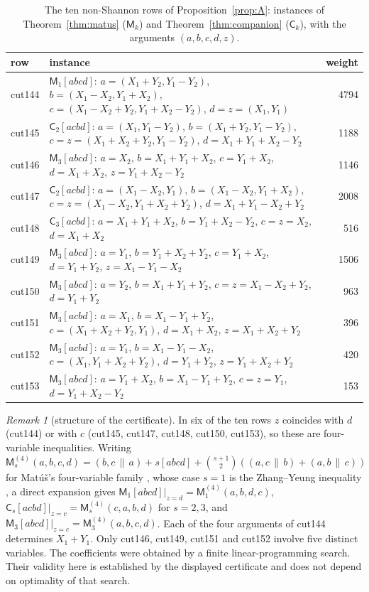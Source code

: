 \documentclass[11pt]{amsart}
\theoremstyle{definition}
\theoremstyle{remark}
\newtheorem{remark}[theorem]{Remark}
\numberwithin{equation}{section}
\newcommand{\cmi}[3]{(#1,#2\,\|\,#3)}
\begin{document}
\begin{table}[ht]
\small
\caption{The ten non-Shannon rows of Proposition~\ref{prop:A}: instances of
Theorem~\ref{thm:matus} ($\mathsf M_k$) and Theorem~\ref{thm:companion} ($\mathsf C_k$), with the
arguments $(a,b,c,d,z)$.}\label{tab:cuts}
\begin{tabular}{@{}l>{\raggedright\arraybackslash}p{11.2cm}r@{}}
\toprule
row & instance & weight\\
\midrule
cut144 & $\mathsf M_1[abcd]$: $a=(X_1+Y_2,Y_1-Y_2)$, $b=(X_1-X_2,Y_1+X_2)$, $c=(X_1-X_2+Y_2,Y_1+X_2-Y_2)$, $d=z=(X_1,Y_1)$ & 4794 \\
cut145 & $\mathsf C_2[acbd]$: $a=(X_1,Y_1-Y_2)$, $b=(X_1+Y_2,Y_1-Y_2)$, $c=z=(X_1+X_2+Y_2,Y_1-Y_2)$, $d=X_1+Y_1+X_2-Y_2$ & 1188 \\
cut146 & $\mathsf M_3[abcd]$: $a=X_2$, $b=X_1+Y_1+X_2$, $c=Y_1+X_2$, $d=X_1+X_2$, $z=Y_1+X_2-Y_2$ & 1146 \\
cut147 & $\mathsf C_2[acbd]$: $a=(X_1-X_2,Y_1)$, $b=(X_1-X_2,Y_1+X_2)$, $c=z=(X_1-X_2,Y_1+X_2+Y_2)$, $d=X_1+Y_1-X_2+Y_2$ & 2008 \\
cut148 & $\mathsf C_3[acbd]$: $a=X_1+Y_1+X_2$, $b=Y_1+X_2-Y_2$, $c=z=X_2$, $d=X_1+X_2$ & 516 \\
cut149 & $\mathsf M_3[abcd]$: $a=Y_1$, $b=Y_1+X_2+Y_2$, $c=Y_1+X_2$, $d=Y_1+Y_2$, $z=X_1-Y_1-X_2$ & 1506 \\
cut150 & $\mathsf M_3[abcd]$: $a=Y_2$, $b=X_1+Y_1+Y_2$, $c=z=X_1-X_2+Y_2$, $d=Y_1+Y_2$ & 963 \\
cut151 & $\mathsf M_3[acbd]$: $a=X_1$, $b=X_1-Y_1+Y_2$, $c=(X_1+X_2+Y_2,Y_1)$, $d=X_1+X_2$, $z=X_1+X_2+Y_2$ & 396 \\
cut152 & $\mathsf M_3[acbd]$: $a=Y_1$, $b=X_1-Y_1-X_2$, $c=(X_1,Y_1+X_2+Y_2)$, $d=Y_1+Y_2$, $z=Y_1+X_2+Y_2$ & 420 \\
cut153 & $\mathsf M_3[abcd]$: $a=Y_1+X_2$, $b=X_1-Y_1+Y_2$, $c=z=Y_1$, $d=Y_1+X_2-Y_2$ & 153 \\
\bottomrule
\end{tabular}
\end{table}

\begin{remark}[structure of the certificate]\label{rem:cuts}
In six of the ten rows $z$ coincides with $d$ (cut144) or with $c$ (cut145, cut147, cut148,
cut150, cut153), so these are four-variable inequalities. Writing
$\mathsf M^{(4)}_s(a,b,c,d)=\cmi bca+s[abcd]+\binom{s+1}2(\cmi acb+\cmi abc)$ for Mat\'u\v{s}'s
four-variable family \cite{Mat07}, whose case $s=1$ is the Zhang--Yeung inequality \cite{ZY98}, a
direct expansion gives $\mathsf M_1[abcd]|_{z=d}=\mathsf M^{(4)}_1(a,b,d,c)$,
$\mathsf C_s[acbd]|_{z=c}=\mathsf M^{(4)}_s(c,a,b,d)$ for $s=2,3$, and
$\mathsf M_3[abcd]|_{z=c}=\mathsf M^{(4)}_3(a,b,c,d)$. Each of the four arguments of cut144
determines $X_1+Y_1$. Only cut146, cut149, cut151 and cut152 involve five distinct variables. The coefficients were obtained by a finite linear-programming search.
Their validity here is established by the displayed certificate and does not
depend on optimality of that search.
\end{remark}
\end{document}
